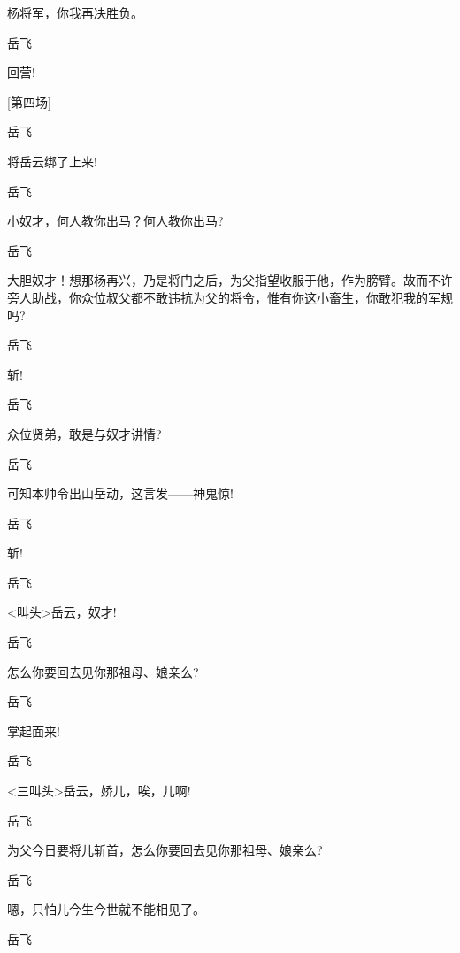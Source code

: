 {{{{杨将军，你我再决胜负。}

{岳飞\hspace{30pt}~

回营!}

{{[}第四场{]}}

{岳飞\hspace{30pt}~

将岳云绑了上来!}

{岳飞\hspace{30pt}~

小奴才，何人教你出马？何人教你出马?}

{岳飞

大胆奴才！想那杨再兴，乃是将门之后，为父指望收服于他，作为膀臂。故而不许旁人助战，你众位叔父都不敢违抗为父的将令，惟有你这小畜生，你敢犯我的军规吗?}

{岳飞\hspace{30pt}~

斩!}

{岳飞\hspace{30pt}~

众位贤弟，敢是与奴才讲情?}

{岳飞\hspace{30pt}~

可知本帅令出山岳动，这言发------神鬼惊!}

{岳飞\hspace{30pt}~

斩!}

{岳飞\hspace{30pt}~

\textless{}叫头\textgreater{}岳云，奴才!}

{岳飞\hspace{30pt}~

怎么你要回去见你那祖母、娘亲么?}

{岳飞\hspace{30pt}~

掌起面来!}

{岳飞\hspace{30pt}~

\textless{}三叫头\textgreater{}岳云，娇儿，唉，儿啊!}

{岳飞\hspace{30pt}~

为父今日要将儿斩首，怎么你要回去见你那祖母、娘亲么?}

{岳飞\hspace{30pt}~

嗯，只怕儿今生今世就不能相见了。}

{岳飞\hspace{30pt}~

}}}}
